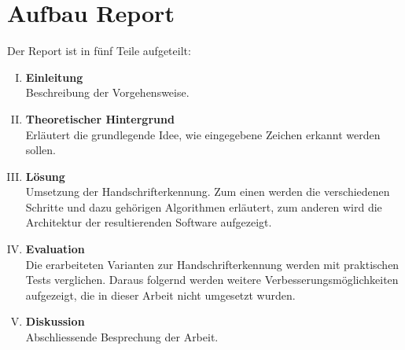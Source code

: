 \chapter{Aufbau Report}
Der Report ist in fünf Teile aufgeteilt:
\begin{enumerate}[I.]
\item \textbf{Einleitung} \\ Beschreibung der Vorgehensweise.
\item \textbf{Theoretischer Hintergrund} \\ Erläutert die grundlegende Idee, wie eingegebene Zeichen erkannt werden sollen.
\item \textbf{Lösung} \\ Umsetzung der Handschrifterkennung. Zum einen werden die verschiedenen Schritte und dazu gehörigen Algorithmen erläutert, zum anderen wird die Architektur der resultierenden Software aufgezeigt.
\item \textbf{Evaluation} \\ Die erarbeiteten Varianten zur Handschrifterkennung werden mit praktischen Tests verglichen. Daraus folgernd werden weitere Verbesserungsmöglichkeiten aufgezeigt, die in dieser Arbeit nicht umgesetzt wurden.
\item \textbf{Diskussion} \\ Abschliessende Besprechung der Arbeit.
\end{enumerate}